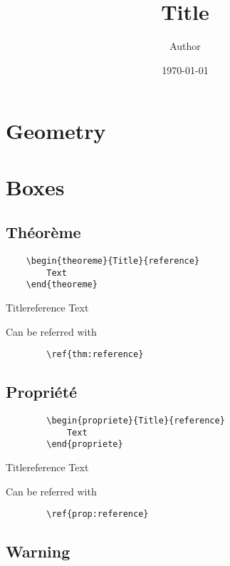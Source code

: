 \documentclass[french]{article}
\title{Title}
\date{\today{}}
\author{Author}
\begin{document}
\maketitle
    \section{Geometry}
    \lipsum[0-3]

    \section{Boxes}

    \subsection{Théorème}
    
    \begin{verbatim}
    \begin{theoreme}{Title}{reference}
        Text
    \end{theoreme}
    \end{verbatim}

    \begin{theoreme}{Title}{reference}
        Text
    \end{theoreme}

    Can be referred with 
    \begin{verbatim} 
        \ref{thm:reference}
    \end{verbatim}

    \subsection{Propriété}
    \begin{verbatim}
        \begin{propriete}{Title}{reference}
            Text
        \end{propriete}
    \end{verbatim}

    \begin{propriete}{Title}{reference}
        Text
    \end{propriete}

    Can be referred with 
    \begin{verbatim} 
        \ref{prop:reference}
    \end{verbatim}

    \subsection{Warning}
\end{document}
